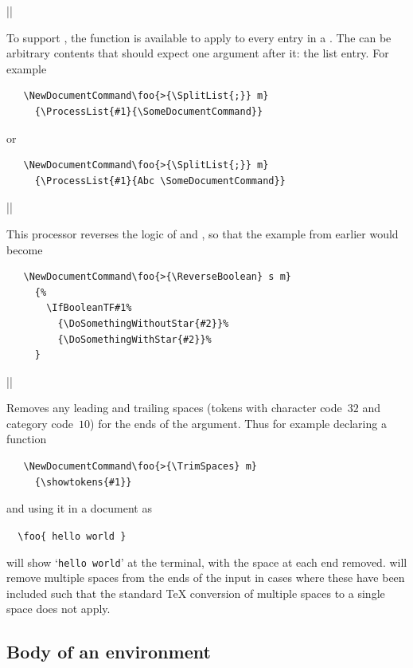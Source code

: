 \documentclass{ltxguide}
\begin{document}
\begin{decl}
  |\ProcessList|  
\end{decl}
To support , the function  is available
to apply  to every entry in a . The
 can be arbitrary contents that should expect one argument
after it: the list entry. For example
\begin{verbatim}
   \NewDocumentCommand\foo{>{\SplitList{;}} m}
     {\ProcessList{#1}{\SomeDocumentCommand}}
\end{verbatim}
or
\begin{verbatim}
   \NewDocumentCommand\foo{>{\SplitList{;}} m}
     {\ProcessList{#1}{Abc \SomeDocumentCommand}}
\end{verbatim}

\begin{decl}
  |\ReverseBoolean|
\end{decl}
This processor reverses the logic of  and
, so that the example from earlier would become
\begin{verbatim}
   \NewDocumentCommand\foo{>{\ReverseBoolean} s m}
     {%
       \IfBooleanTF#1%
         {\DoSomethingWithoutStar{#2}}%
         {\DoSomethingWithStar{#2}}%
     }
\end{verbatim}

\begin{decl}
  |\TrimSpaces|
\end{decl}
Removes any leading and trailing spaces (tokens with character code~$32$
and category code~$10$) for the ends of the argument. Thus for example
declaring a function
\begin{verbatim}
   \NewDocumentCommand\foo{>{\TrimSpaces} m}
     {\showtokens{#1}}
\end{verbatim}
and using it in a document as
\begin{flushleft}
  \verb=  =\verb*=\foo{ hello world }=
\end{flushleft}
will show `\verb*=hello world=' at the terminal, with the space at each
end removed.  will remove multiple spaces from the ends of
the input in cases where these have been included such that the standard
\TeX{} conversion of multiple spaces to a single space does not apply.

\subsection{Body of an environment}
\label{sec:cmd:body}
\end{document}
